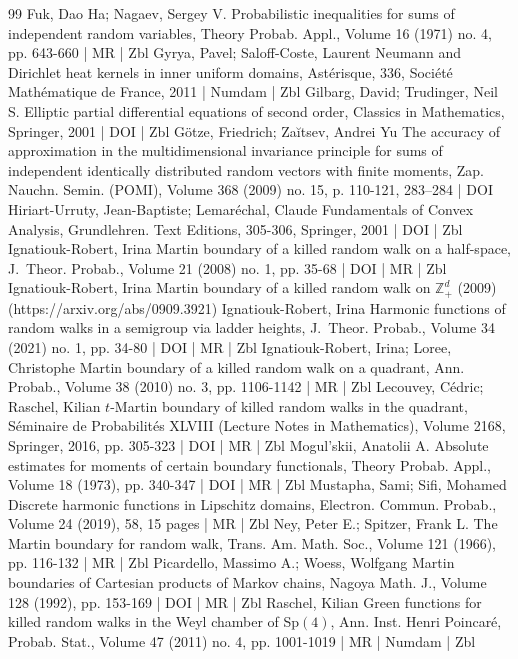 \begin{thebibliography}{99}
Fuk, Dao Ha; Nagaev, Sergey V. Probabilistic inequalities for sums of independent random variables, Theory Probab. Appl., Volume 16 (1971) no. 4, pp. 643-660 | MR | Zbl
Gyrya, Pavel; Saloff-Coste, Laurent Neumann and Dirichlet heat kernels in inner uniform domains, Astérisque, 336, Société Mathématique de France, 2011 | Numdam | Zbl
Gilbarg, David; Trudinger, Neil S. Elliptic partial differential equations of second order, Classics in Mathematics, Springer, 2001 | DOI | Zbl
Götze, Friedrich; Zaĭtsev, Andrei Yu The accuracy of approximation in the multidimensional invariance principle for sums of independent identically distributed random vectors with finite moments, Zap. Nauchn. Semin. (POMI), Volume 368 (2009) no. 15, p. 110-121, 283–284 | DOI
Hiriart-Urruty, Jean-Baptiste; Lemaréchal, Claude Fundamentals of Convex Analysis, Grundlehren. Text Editions, 305-306, Springer, 2001 | DOI | Zbl
Ignatiouk-Robert, Irina Martin boundary of a killed random walk on a half-space, J. Theor. Probab., Volume 21 (2008) no. 1, pp. 35-68 | DOI | MR | Zbl
Ignatiouk-Robert, Irina Martin boundary of a killed random walk on $\mathbb{Z}_+^d$ (2009) (https://arxiv.org/abs/0909.3921)
Ignatiouk-Robert, Irina Harmonic functions of random walks in a semigroup via ladder heights, J. Theor. Probab., Volume 34 (2021) no. 1, pp. 34-80 | DOI | MR | Zbl
Ignatiouk-Robert, Irina; Loree, Christophe Martin boundary of a killed random walk on a quadrant, Ann. Probab., Volume 38 (2010) no. 3, pp. 1106-1142 | MR | Zbl
Lecouvey, Cédric; Raschel, Kilian $t$-Martin boundary of killed random walks in the quadrant, Séminaire de Probabilités XLVIII (Lecture Notes in Mathematics), Volume 2168, Springer, 2016, pp. 305-323 | DOI | MR | Zbl
Mogul’skii, Anatolii A. Absolute estimates for moments of certain boundary functionals, Theory Probab. Appl., Volume 18 (1973), pp. 340-347 | DOI | MR | Zbl
Mustapha, Sami; Sifi, Mohamed Discrete harmonic functions in Lipschitz domains, Electron. Commun. Probab., Volume 24 (2019), 58, 15 pages | MR | Zbl
Ney, Peter E.; Spitzer, Frank L. The Martin boundary for random walk, Trans. Am. Math. Soc., Volume 121 (1966), pp. 116-132 | MR | Zbl
Picardello, Massimo A.; Woess, Wolfgang Martin boundaries of Cartesian products of Markov chains, Nagoya Math. J., Volume 128 (1992), pp. 153-169 | DOI | MR | Zbl
Raschel, Kilian Green functions for killed random walks in the Weyl chamber of Sp$(4)$, Ann. Inst. Henri Poincaré, Probab. Stat., Volume 47 (2011) no. 4, pp. 1001-1019 | MR | Numdam | Zbl

\end{thebibliography}
